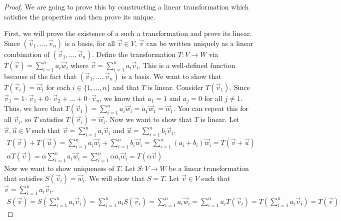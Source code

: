\begin{proof}
    We are going to prove this by constructing a linear transformation which satisfies the properties and then prove its unique.

    First, we will prove the existence of a such a transformation and prove its linear. Since $(\vec{v}_1,\ldots,\vec{v}_n)$ is a basis, for all $\vec{v}\in V$, $\vec{v}$ can be written uniquely as a linear combination of $(\vec{v}_1,\ldots,\vec{v}_n)$. Define the transformation $T:V\to W$ via $T(\vec{v})=\sum_{i=1}^n a_i\vec{w}_i$ where $\vec{v}=\sum_{i=1}^n a_i\vec{v}_i$. This is a well-defined function because of the fact that $(\vec{v}_1,\ldots,\vec{v}_n)$ is a basis. We want to show that $T(\vec{v}_i)=\vec{w}_i$ for each $i\in\{1,\ldots, n\}$ and that $T$ is linear. Consider $T(\vec{v}_1)$. Since $\vec{v}_1=1\cdot\vec{v}_1+0\cdot\vec{v}_2+\ldots+0\cdot\vec{v}_n$, we know that $a_1=1$ and $a_j=0$ for all $j\neq 1$. Thus, we have that $T(\vec{v}_1)=\sum_{i=1}^n a_i\vec{w}_i=a_1\vec{w}_1=\vec{w}_1$. You can repeat this for all $\vec{v}_i$, so $T$ satisfies $T(\vec{v}_i)=\vec{w}_i$. Now we want to show that $T$ is linear. Let $\vec{v},\vec{u}\in V$ such that $\vec{v}=\sum_{i=1}^n a_i\vec{v}_i$ and $\vec{u}=\sum_{i=1}^n b_i\vec{v}_i$.
    \begin{align*}
        T(\vec{v})+T(\vec{u})=\sum_{i=1}^n a_i\vec{w}_i+\sum_{i=1}^n b_i\vec{w}_i=\sum_{i=1}^n (a_i+b_i)\vec{w}_i=T(\vec{v}+\vec{u})\\
        \alpha T(\vec{v})=\alpha\sum_{i=1}^n a_i\vec{w}_i=\sum_{i=1}^n \alpha a_i\vec{w}_i=T(\alpha\vec{v})
    \end{align*}
    Now we want to show uniqueness of $T$. Let $S: V\to W$ be a linear transformation that satisfies $S(\vec{v}_i)=\vec{w}_i$. We will show that $S=T$. Let $\vec{v}\in V$ such that $\vec{v}=\sum_{i=1}^n a_i\vec{v}_i$.
    \begin{align*}
        S(\vec{v})=S(\sum_{i=1}^n a_i\vec{v}_i)=\sum_{i=1}^n a_iS(\vec{v}_i)=\sum_{i=1}^n a_i\vec{w}_i=\sum_{i=1}^n a_iT(\vec{v}_i)=T(\sum_{i=1}^n a_i\vec{v}_i)=T(\vec{v})
    \end{align*}
\end{proof}
